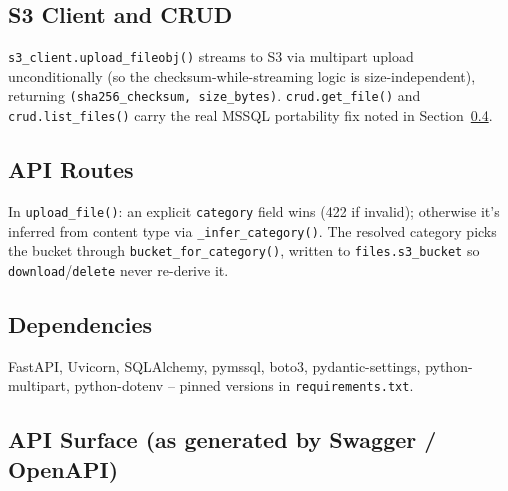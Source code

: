 \documentclass[10pt]{article}
\begin{document}
\subsection{S3 Client and CRUD}
\texttt{s3\_client.upload\_fileobj()} streams to S3 via multipart upload
unconditionally (so the checksum-while-streaming logic is size-independent),
returning \texttt{(sha256\_checksum, size\_bytes)}.
\texttt{crud.get\_file()} and \texttt{crud.list\_files()} carry the real
MSSQL portability fix noted in Section~\ref{sec:verification}.

\subsection{API Routes}
\label{sec:app-routes}

In \texttt{upload\_file()}: an explicit \texttt{category} field wins (422 if
invalid); otherwise it's inferred from content type via
\texttt{\_infer\_category()}. The resolved category picks the bucket through
\texttt{bucket\_for\_category()}, written to \texttt{files.s3\_bucket} so
\texttt{download}/\texttt{delete} never re-derive it.

\subsection{Dependencies}
FastAPI, Uvicorn, SQLAlchemy, pymssql, boto3, pydantic-settings,
python-multipart, python-dotenv -- pinned versions in \texttt{requirements.txt}.

\subsection{API Surface (as generated by Swagger / OpenAPI)}
\label{sec:verification}
\end{document}
